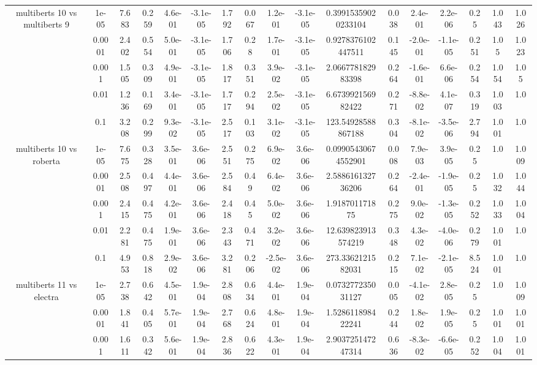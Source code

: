\begin{tabular}{|c|c|c|c|c|c|c|c|c|c|c|c|c|c|c|c|c|}
\hline
\multirow{5}{*}{multiberts 10 vs multiberts 9} & 1e-05 & 7.683 & 0.259 & 4.6e-01 & -3.1e-05 & 1.792 & 0.067 & 1.2e-01 & -3.1e-05 & 0.39915359020233104 & 0.038 & 2.4e-01 & 2.2e-06 & 0.25 & 1.043 & 1.026 \\
 & 0.0001 & 2.402 & 0.554 & 5.0e-01 & -3.1e-05 & 1.706 & 0.28 & 1.7e-01 & -3.1e-05 & 0.9278376102447511 & 0.145 & -2.0e-01 & -1.1e-05 & 0.251 & 1.05 & 1.023 \\
 & 0.001 & 1.505 & 0.309 & 4.9e-01 & -3.1e-05 & 1.817 & 0.351 & 3.9e-02 & -3.1e-05 & 2.066778182983398 & 0.264 & -1.6e-01 & 6.6e-06 & 0.254 & 1.054 & 1.05 \\
 & 0.01 & 1.236 & 0.169 & 3.4e-01 & -3.1e-05 & 1.717 & 0.294 & 2.5e-02 & -3.1e-05 & 6.673992156982422 & 0.271 & -8.8e-02 & 4.1e-07 & 0.319 & 1.003 & 1.0 \\
 & 0.1 & 3.208 & 0.299 & 9.3e-02 & -3.1e-05 & 2.517 & 0.103 & 3.1e-02 & -3.1e-05 & 123.54928588867188 & 0.304 & -8.1e-02 & -3.5e-06 & 2.794 & 1.001 & 1.0 \\
\hline
\multirow{5}{*}{multiberts 10 vs roberta } & 1e-05 & 7.675 & 0.328 & 3.5e-01 & 3.6e-06 & 2.551 & 0.275 & 6.9e-02 & 3.6e-06 & 0.09905430674552901 & 0.008 & 7.9e-03 & 3.9e-05 & 0.25 & 1.0 & 1.009 \\
 & 0.0001 & 2.508 & 0.497 & 4.4e-01 & 3.6e-06 & 2.584 & 0.49 & 6.4e-02 & 3.6e-06 & 2.588616132736206 & 0.264 & -2.4e-01 & -1.9e-05 & 0.25 & 1.032 & 1.044 \\
 & 0.001 & 2.415 & 0.475 & 4.2e-01 & 3.6e-06 & 2.418 & 0.45 & 5.0e-02 & 3.6e-06 & 1.918701171875 & 0.275 & 9.0e-02 & -1.3e-05 & 0.252 & 1.033 & 1.004 \\
 & 0.01 & 2.281 & 0.475 & 1.9e-01 & 3.6e-06 & 2.343 & 0.471 & 3.2e-02 & 3.6e-06 & 12.639823913574219 & 0.348 & 4.3e-02 & -4.0e-06 & 0.279 & 1.001 & 1.0 \\
 & 0.1 & 4.953 & 0.818 & 2.9e-02 & 3.6e-06 & 3.281 & 0.206 & -2.5e-02 & 3.6e-06 & 273.3362121582031 & 0.215 & 7.1e-02 & -2.1e-05 & 8.524 & 1.001 & 1.0 \\
\hline
\multirow{5}{*}{multiberts 11 vs electra } & 1e-05 & 2.738 & 0.642 & 4.5e-01 & 1.9e-04 & 2.808 & 0.634 & 4.4e-01 & 1.9e-04 & 0.073277235031127 & 0.005 & -4.1e-02 & 2.8e-05 & 0.25 & 1.0 & 1.009 \\
 & 0.0001 & 1.841 & 0.405 & 5.7e-01 & 1.9e-04 & 2.768 & 0.624 & 4.8e-01 & 1.9e-04 & 1.528611898422241 & 0.244 & 1.8e-02 & 1.9e-05 & 0.25 & 1.001 & 1.001 \\
 & 0.001 & 1.611 & 0.342 & 5.6e-01 & 1.9e-04 & 2.836 & 0.622 & 4.3e-01 & 1.9e-04 & 2.903725147247314 & 0.636 & -8.3e-02 & -6.6e-05 & 0.252 & 1.004 & 1.001 \\

\end{tabular}
